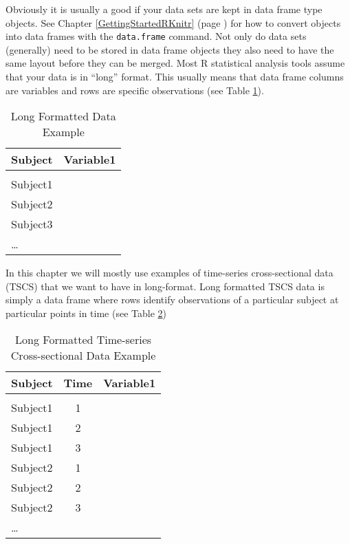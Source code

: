 Obviously it is usually a good if your data sets are kept in data frame type objects. See Chapter \ref{GettingStartedRKnitr} (page \pageref{data.frame}) for how to convert objects into data frames with the \texttt{data.frame} command. Not only do data sets (generally) need to be stored in data frame objects they also need to have the same layout before they can be merged. Most R statistical analysis tools assume that your data is in ``long'' format. This usually means that data frame columns are variables and rows are specific observations (see Table \ref{ExampleLong}).

\begin{table}[h!]
    \caption{Long Formatted Data Example}
    \label{ExampleLong}
    \begin{tabular}{l c}
        \\[0.15cm]
        \hline
        Subject & Variable1 \\
        \hline \\[0.1cm]
        Subject1 & \\[0.25cm]
        Subject2 & \\[0.25cm]
        Subject3 & \\[0.25cm]
        \ldots & \\[0.25cm]
        \hline
    \end{tabular}
\end{table}

\noindent In this chapter we will mostly use examples of time-series cross-sectional data (TSCS) that we want to have in long-format. Long formatted TSCS data is simply a data frame where rows identify observations of a particular subject at particular points in time (see Table \ref{ExampleTSCSLong})

 \begin{table}[h!]
    \caption{Long Formatted Time-series Cross-sectional Data Example}
    \label{ExampleTSCSLong}
    \begin{tabular}{l c c}
        \\[0.15cm]
        \hline
        Subject & Time & Variable1 \\
        \hline \\[0.1cm]
        Subject1 & 1 & \\[0.25cm]
        Subject1 & 2 & \\[0.25cm]
        Subject1 & 3 & \\[0.25cm]
        Subject2 & 1 & \\[0.25cm]
        Subject2 & 2 & \\[0.25cm]
        Subject2 & 3 & \\[0.25cm]
        \ldots & & \\[0.25cm]
        \hline
    \end{tabular}
\end{table}

